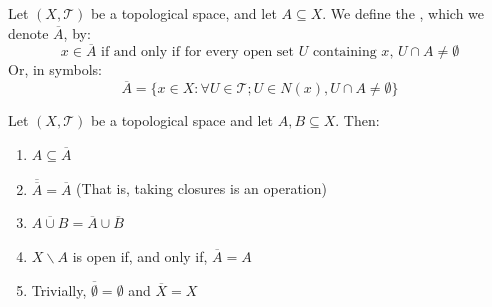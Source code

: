 \documentclass[12pt, a4paper, oneside, openright, titlepage]{book}
\begin{document}
\begin{defn}
    Let $(X,\mathcal{T})$ be a topological space, and let $A \subseteq X$. We define the , which we denote $\overline{A}$, by: \begin{equation*}
        x \in \overline{A}\text{ if and only if for every open set $U$ containing $x$, } U\cap A\neq \emptyset
    \end{equation*}
    Or, in symbols: \begin{equation*}
        \overline{A} = \{x \in X:\forall U\in\mathcal{T};U \in N(x), U\cap A\neq \emptyset\}
    \end{equation*}
\end{defn}


\begin{prop}
    Let $(X,\mathcal{T})$ be a topological space and let $A,B\subseteq X$. Then:\begin{enumerate}
        \item $A\subseteq \overline{A}$
        \item $\overline{\overline{A}} = \overline{A}$ (That is, taking closures is an  operation)
        \item $\overline{A\cup B} = \overline{A}\cup\overline{B}$
        \item $X\backslash A$ is open if, and only if, $\overline{A} = A$
        \item Trivially, $\overline{\emptyset} = \emptyset$ and $\overline{X} = X$
    \end{enumerate}
\end{prop}
\end{document}
